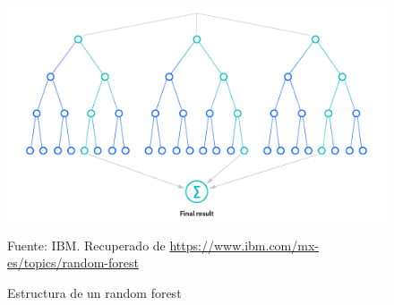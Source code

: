 \begin{figure}[H]
    \begin{minipage}[t]{0.9\textwidth}
        \caption{Estructura de un random forest}
        \label{random-forest}        
    \end{minipage}

    \vspace{10pt}

    \begin{minipage}[b]{1.1\textwidth}
        \centering
        \includegraphics[width=\textwidth]{img/estructura-random-forest.png}        
    \end{minipage}

    \begin{minipage}[t]{0.9\textwidth}
        Fuente: IBM. Recuperado de \url{https://www.ibm.com/mx-es/topics/random-forest}
    \end{minipage}
\end{figure}

